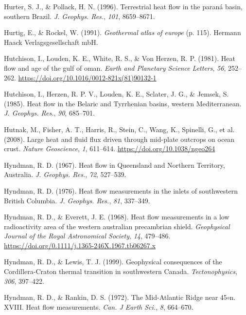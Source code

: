 \begin{CSLReferences}{1}{1}
\leavevmode{}%
Hurter, S. J., \& Pollack, H. N. (1996). Terrestrial heat flow in the paraná basin, southern {Brazil}. \emph{J. Geophys. Res.}, \emph{101}, 8659--8671.

\leavevmode{}%
Hurtig, E., \& Rockel, W. (1991). \emph{Geothermal atlas of europe} (p. 115). Hermann Haack Verlagsgesellschaft mbH.

\leavevmode{}%
Hutchison, I., Louden, K. E., White, R. S., \& Von Herzen, R. P. (1981). Heat flow and age of the gulf of oman. \emph{Earth and Planetary Science Letters}, \emph{56}, 252--262. \url{https://doi.org/10.1016/0012-821x(81)90132-1}

\leavevmode{}%
Hutchison, I., Herzen, R. P. V., Louden, K. E., Sclater, J. G., \& Jemsek, S. (1985). Heat flow in the {Belaric and Tyrrhenian basins, western Mediterranean}. \emph{J. Geophys. Res.}, \emph{90}, 685--701.

\leavevmode{}%
Hutnak, M., Fisher, A. T., Harris, R., Stein, C., Wang, K., Spinelli, G., et al. (2008). Large heat and fluid flux driven through mid-plate outcrops on ocean crust. \emph{Nature Geoscience}, \emph{1}, 611--614. \url{https://doi.org/10.1038/ngeo264}

\leavevmode{}%
Hyndman, R. D. (1967). Heat flow in {Queensland and Northern Territory, Australia}. \emph{J. Geophys. Res.}, \emph{72}, 527--539.

\leavevmode{}%
Hyndman, R. D. (1976). Heat flow measurements in the inlets of southwestern {British Columbia}. \emph{J. Geophys. Res.}, \emph{81}, 337--349.

\leavevmode{}%
Hyndman, R. D., \& Everett, J. E. (1968). Heat flow measurements in a low radioactivity area of the western australian precambrian shield. \emph{Geophysical Journal of the Royal Astronomical Society}, \emph{14}, 479--486. \url{https://doi.org/0.1111/j.1365-246X.1967.tb06267.x}

\leavevmode{}%
Hyndman, R. D., \& Lewis, T. J. (1999). Geophysical consequences of the {Cordillera-Craton} thermal transition in southwestern {Canada}. \emph{Tectonophysics}, \emph{306}, 397--422.

\leavevmode{}%
Hyndman, R. D., \& Rankin, D. S. (1972). The {Mid-Atlantic Ridge} near 45\(\circ\)n. XVIII. Heat flow measurements. \emph{Can. J Earth Sci.}, \emph{8}, 664--670.


\end{CSLReferences}
